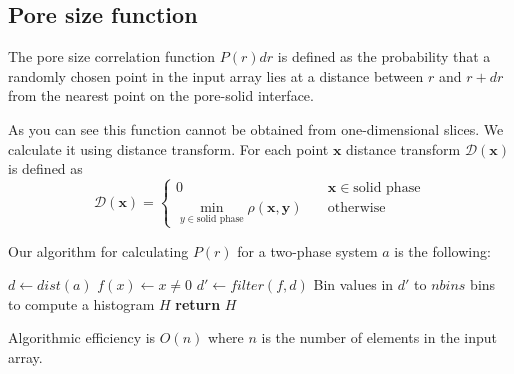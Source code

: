 \documentclass[reprint,amsmath,amssymb,aps,pre,showkeys,showpacs,nofootinbib]{revtex4-1}
\begin{document}
\subsection{Pore size function}
The pore size correlation function $P(r)dr$ is defined as the probability that a
randomly chosen point in the input array lies at a distance between
$r$ and $r + dr$ from the nearest point on the pore-solid interface.

As you can see this function cannot be obtained from one-dimensional slices. We
calculate it using distance transform. For each point $\bm{x}$ distance
transform $\mathcal{D}(\bm{x})$ is defined as
\begin{equation*}
  \mathcal{D}(\bm{x})= \left\{
  \begin{array}{ll}
    0 & \quad \bm{x} \in \text{solid phase} \\
    \min\limits_{y \in \text{solid phase}} \rho(\bm{x},\bm{y}) & \quad \text{otherwise}
  \end{array}
\right.
\end{equation*}

Our algorithm for calculating $P(r)$ for a two-phase system $a$ is the
following:
\begin{algorithmic}[1]
    \State $d \gets dist(a)$ 
    \State $f(x) \gets x \ne 0$
    \State $d' \gets filter(f, d)$
    \State Bin values in $d'$ to $nbins$ bins to compute a histogram $H$
    \State \textbf{return} $H$
  \EndProcedure
\end{algorithmic}
Algorithmic efficiency is $O(n)$ where $n$ is the number of elements in the
input array.
\end{document}

